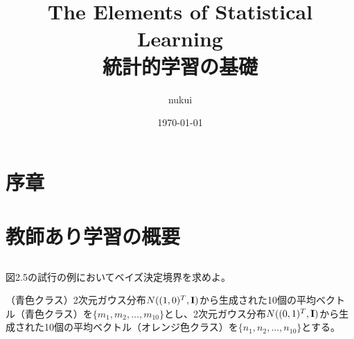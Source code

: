 \documentclass{jsarticle}
\begin{document}
\title{The Elements of Statistical Learning\\統計的学習の基礎}
\author{nukui}
\date{\today}
\maketitle



\section{序章}
\section{教師あり学習の概要}
\subsection{}


\subsection{}
\begin{shadebox}
図2.5の試行の例においてベイズ決定境界を求めよ。
\end{shadebox}
（青色クラス）2次元ガウス分布$N((1,0)^T,\bf{I})$から生成された10個の平均ベクトル（青色クラス）を$\{m_1,m_2,...,m_{10}\}$とし、2次元ガウス分布$N((0,1)^T,\bf{I})$から生成された10個の平均ベクトル（オレンジ色クラス）を$\{n_1,n_2,...,n_{10}\}$とする。
\end{document}
